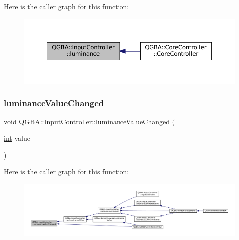Here is the caller graph for this function\+:
\nopagebreak
\begin{figure}[H]
\begin{center}
\leavevmode
\includegraphics[width=350pt]{class_q_g_b_a_1_1_input_controller_a0d11486244b97b4581f651b212bcdbc5_icgraph}
\end{center}
\end{figure}
\mbox{\label{class_q_g_b_a_1_1_input_controller_aa8fd0c128275fb3ec80e51d770770000}} 
\subsubsection{\texorpdfstring{luminance\+Value\+Changed}{luminanceValueChanged}}
{\footnotesize\ttfamily void Q\+G\+B\+A\+::\+Input\+Controller\+::luminance\+Value\+Changed (\begin{DoxyParamCaption}\item[{\mbox{\hyperlink{ioapi_8h_a787fa3cf048117ba7123753c1e74fcd6}{int}}}]{value }\end{DoxyParamCaption})\hspace{0.3cm}{\ttfamily [signal]}}

Here is the caller graph for this function\+:
\nopagebreak
\begin{figure}[H]
\begin{center}
\leavevmode
\includegraphics[width=350pt]{class_q_g_b_a_1_1_input_controller_aa8fd0c128275fb3ec80e51d770770000_icgraph}
\end{center}
\end{figure}
\mbox{\label{class_q_g_b_a_1_1_input_controller_a7b4aaedf3b76edb0490967bfbff6f32e}} 
